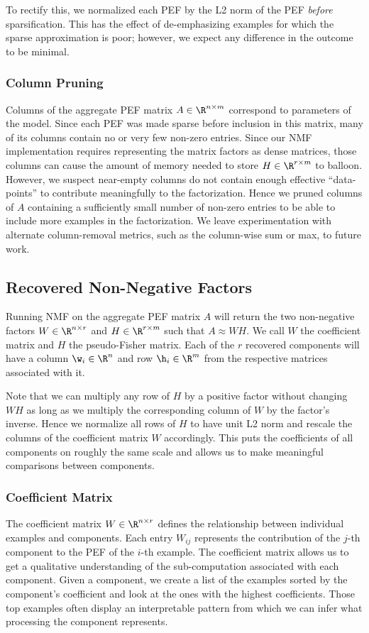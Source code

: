 \documentclass[dvipsnames]{article}
\begin{document}
To rectify this, we normalized each PEF by the L2 norm of the PEF \textit{before} sparsification.
This has the effect of de-emphasizing examples for which the sparse approximation is poor; however, we expect any difference in the outcome to be minimal.

\subsubsection{Column Pruning}
Columns of the aggregate PEF matrix $A \in \R^{n\times m}$ correspond to parameters of the model.
Since each PEF was made sparse before inclusion in this matrix, many of its columns contain no or very few non-zero entries.
Since our NMF implementation requires representing the matrix factors as dense matrices, those columns can cause the amount of memory needed to store $H \in \R^{r\times m}$ to balloon.
However, we suspect near-empty columns do not contain enough effective ``data-points'' to contribute meaningfully to the factorization.
Hence we pruned columns of $A$ containing a sufficiently small number of non-zero entries to be able to include more examples in the factorization.
We leave experimentation with alternate column-removal metrics, such as the column-wise sum or max, to future work.

\subsection{Recovered Non-Negative Factors}
Running NMF on the aggregate PEF matrix $A$ will return the two non-negative factors $W \in \R^{n\times r}$ and $H \in \R^{r\times m}$ such that $A \approx WH$.
We call $W$ the coefficient matrix and $H$ the pseudo-Fisher matrix.
Each of the $r$ recovered components will have a column $\w_i \in \R^n$ and row $\h_i \in \R^m$ from the respective matrices associated with it.


Note that we can multiply any row of $H$ by a positive factor without changing $WH$ as long as we multiply the corresponding column of $W$ by the factor's inverse.
Hence we normalize all rows of $H$ to have unit L2 norm and rescale the columns of the coefficient matrix $W$ accordingly.
This puts the coefficients of all components on roughly the same scale and allows us to make meaningful comparisons between components.

\subsubsection{Coefficient Matrix}
The coefficient matrix $W \in \R^{n\times r}$ defines the relationship between individual examples and components.
Each entry $W_{ij}$ represents the contribution of the $j$-th component to the PEF of the $i$-th example.
The coefficient matrix allows us to get a qualitative understanding of the sub-computation associated with each component.
Given a component, we create a list of the examples sorted by the component's coefficient and look at the ones with the highest coefficients.
Those top examples often display an interpretable pattern from which we can infer what processing the component represents.
\end{document}
